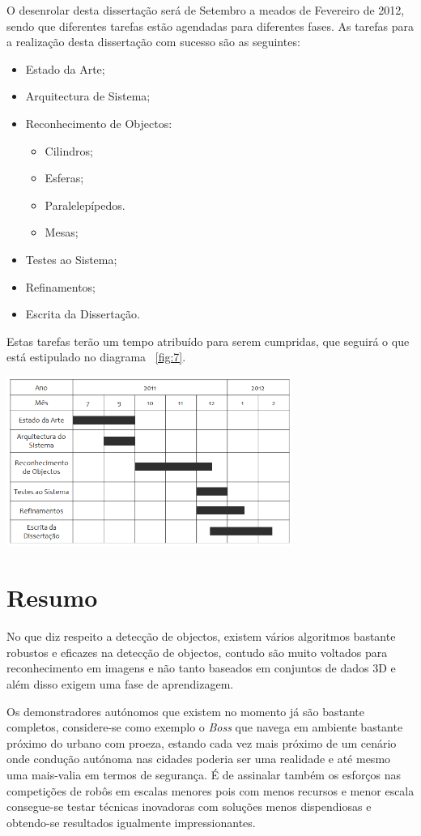 O desenrolar desta dissertação será de Setembro a meados de Fevereiro de 2012, sendo
que diferentes tarefas estão agendadas para diferentes fases. As tarefas para a realização
desta dissertação com sucesso são as seguintes:
\begin{itemize}
\item Estado da Arte;
\item Arquitectura de Sistema;
\item Reconhecimento de Objectos:
\begin{itemize}
\item Cilindros;
\item Esferas;
\item Paralelepípedos.
\item Mesas;
\end{itemize}
\item Testes ao Sistema;
\item Refinamentos;
\item Escrita da Dissertação.
\end{itemize}

Estas tarefas terão um tempo atribuído para serem cumpridas, que seguirá o que está estipulado no
diagrama ~\ref{fig:7}.

\begin{center}
	\includegraphics[width=0.70\textwidth]{figures/diss_timetable.PNG}
	\label{fig:7}
\end{center}

\section{Resumo}

No que diz respeito a detecção de objectos, existem vários algoritmos bastante robustos e
eficazes na detecção de objectos, contudo são muito voltados para reconhecimento em imagens 
e não tanto baseados em conjuntos de dados 3D e além disso exigem uma fase de aprendizagem.

Os demonstradores autónomos que existem no momento já são bastante completos, considere-se
como exemplo o \emph{Boss} que navega em ambiente bastante próximo do urbano com proeza,
estando cada vez mais próximo de um cenário onde condução autónoma nas cidades poderia ser
uma realidade e até mesmo uma mais-valia em termos de segurança. É de assinalar também os esforços
nas competições de robôs em escalas menores pois com menos recursos e menor escala consegue-se
testar técnicas inovadoras com soluções menos dispendiosas e obtendo-se resultados igualmente
impressionantes.


